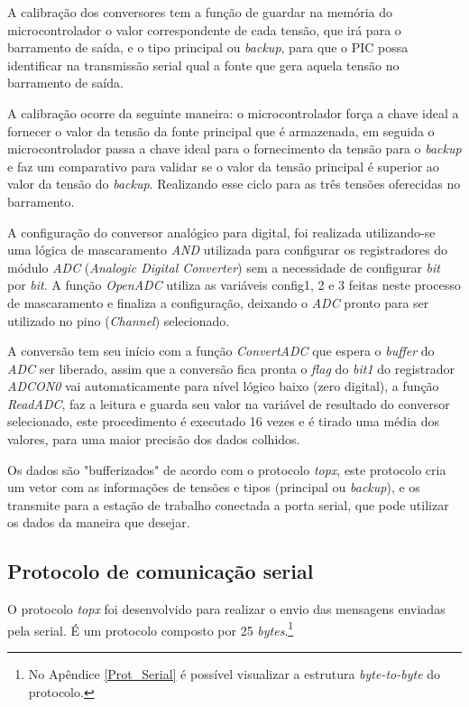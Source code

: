\documentclass[
	12pt,				%
	openright,			%
	oneside,			%
	a4paper,			%
	english,			%
	french,				%
	spanish,			%
	brazil,				%
	oldfontcommands
	]{abntex2}
\begin{document}
	A calibração dos conversores tem a função de guardar na memória do microcontrolador o valor correspondente de cada tensão, que irá para o barramento de saída, e o tipo principal ou \textit{backup}, para que o PIC possa identificar na transmissão serial qual a fonte que gera aquela tensão no barramento de saída.
	
	A calibração ocorre da seguinte maneira: o microcontrolador força a chave ideal a fornecer o valor da tensão da fonte principal que é armazenada, em seguida o microcontrolador passa a chave ideal para o fornecimento da tensão para o \textit{backup} e faz um comparativo para validar se o valor da tensão principal é superior ao valor da tensão do \textit{backup}. Realizando esse ciclo para as três tensões oferecidas no barramento.	
	
	A configuração do conversor analógico para digital, foi realizada utilizando-se uma lógica de mascaramento \textit{AND} utilizada para configurar os registradores do módulo \textit{ADC} (\textit{Analogic Digital Converter}) sem a necessidade de configurar \textit{bit} por \textit{bit}. A função \textit{OpenADC} utiliza as variáveis config1, 2 e 3 feitas neste processo de mascaramento e finaliza a configuração, deixando o \textit{ADC} pronto para ser utilizado no pino (\textit{Channel}) selecionado.
	
	A conversão tem seu início com a função \textit{ConvertADC} que espera o \textit{buffer} do \textit{ADC} ser liberado, assim que a conversão fica pronta o \textit{flag} do \textit{bit1} do registrador \textit{ADCON0} vai automaticamente para nível lógico baixo (zero digital), a função \textit{ReadADC}, faz a leitura e guarda seu valor na variável de resultado do conversor selecionado, este procedimento é executado 16 vezes e é tirado uma média dos valores, para uma maior precisão dos dados colhidos.
	
	Os dados são "bufferizados" de acordo com o protocolo \textit{topx}, este protocolo cria um vetor com as informações de tensões e tipos (principal ou \textit{backup}), e os transmite para a estação de trabalho conectada a porta serial, que pode utilizar os dados da maneira que desejar. 

\subsection[Protocolo de comunicação serial]{Protocolo de comunicação serial}

	O protocolo \textit{topx} foi desenvolvido para realizar o envio das mensagens enviadas pela serial. É um protocolo composto por 25 \textit{bytes}.\footnote{No Apêndice \ref{Prot_Serial} é possível visualizar a estrutura \textit{byte-to-byte} do protocolo.}
	
\end{document}
